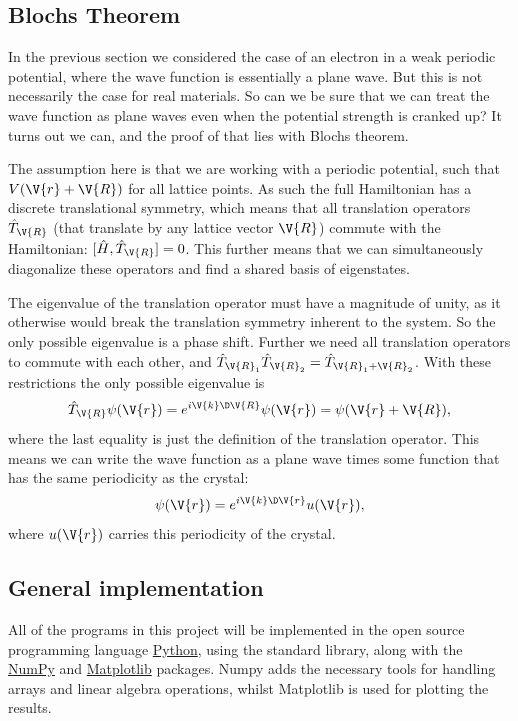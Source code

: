 \documentclass[main.tex]{subfiles}
\begin{document}
	
	
	\subsection{Blochs Theorem}
	In the previous section we considered the case of an electron in a weak periodic potential, where the wave function is essentially a plane wave. But this is not necessarily the case for real materials. So can we be sure that we can treat the wave function as plane waves even when the potential strength is cranked up? It turns out we can, and the proof of that lies with Blochs theorem.
	
	The assumption here is that we are working with a periodic potential, such that $ V(\V{r} + \V{R}) $ for all lattice points. As such the full Hamiltonian has a discrete translational symmetry, which means that all translation operators $ \hat{T}_{\V{R}} $ (that translate by any lattice vector $ \V{R} $) commute with the Hamiltonian: $ [\hat{H}, \hat{T}_{\V{R}}] = 0$. This further means that we can simultaneously diagonalize these operators and find a shared basis of eigenstates.
	
	The eigenvalue of the translation operator must have a magnitude of unity, as it otherwise would break the translation symmetry inherent to the system. So the only possible eigenvalue is a phase shift. Further we need all translation operators to commute with each other, and $ \hat{T}_{\V{R}_1} \hat{T}_{\V{R}_2} = \hat{T}_{\V{R}_1 + \V{R}_2} $. With these restrictions the only possible eigenvalue is
	\begin{equation}
		\hat{T}_{\V{R}} \psi(\V{r}) = e^{i\V{k} \D\V{R}} \psi(\V{r}) = \psi(\V{r}+\V{R}),
	\end{equation}
	where the last equality is just the definition of the translation operator. This means we can write the wave function as a plane wave times some function that has the same periodicity as the crystal:
	\begin{equation}
		\psi(\V{r}) = e^{i\V{k} \D \V{r}} u(\V{r}),
	\end{equation}
	where $ u(\V{r}) $ carries this periodicity of the crystal.
	
	
	
	\subsection{General implementation}
	All of the programs in this project will be implemented in the open source programming language \href{www.python.org}{Python}, using the standard library, along with the \href{www.numpy.org}{NumPy} and \href{www.matplotlib.org}{Matplotlib} packages. Numpy adds the necessary tools for handling arrays and linear algebra operations, whilst Matplotlib is used for plotting the results.
	
\end{document}
